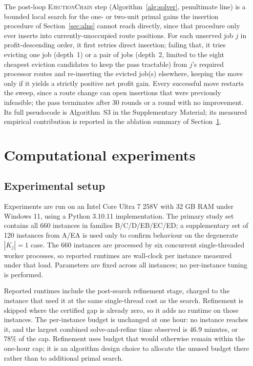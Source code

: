 \documentclass[preprint,12pt]{elsarticle}
\begin{document}
The post-loop \textsc{EjectionChain} step (Algorithm~\ref{alg:solver}, penultimate line) is a bounded local search for the one- or two-unit primal gains the insertion procedure of Section~\ref{sec:alns} cannot reach directly, since that procedure only ever inserts into currently-unoccupied route positions. For each unserved job $j$ in profit-descending order, it first retries direct insertion; failing that, it tries evicting one job (depth~1) or a pair of jobs (depth~2, limited to the eight cheapest eviction candidates to keep the pass tractable) from $j$'s required processor routes and re-inserting the evicted job(s) elsewhere, keeping the move only if it yields a strictly positive net profit gain. Every successful move restarts the sweep, since a route change can open insertions that were previously infeasible; the pass terminates after 30 rounds or a round with no improvement. Its full pseudocode is Algorithm~S3 in the Supplementary Material; its measured empirical contribution is reported in the ablation summary of Section~\ref{sec:experiments}.



\section{Computational experiments}\label{sec:experiments}

\subsection{Experimental setup}

Experiments are run on an Intel Core Ultra 7 258V with 32 GB RAM under Windows 11, using a Python 3.10.11 implementation. The primary study set contains all 660 instances in families B/C/D/EB/EC/ED; a supplementary set of 120 instances from A/EA is used only to confirm behaviour on the degenerate $|K_j|=1$ case. The 660 instances are processed by six concurrent single-threaded worker processes, so reported runtimes are wall-clock per instance measured under that load. Parameters are fixed across all instances; no per-instance tuning is performed.

Reported runtimes include the post-search refinement stage, charged to the instance that used it at the same single-thread cost as the search. Refinement is skipped where the certified gap is already zero, so it adds no runtime on those instances. The per-instance budget is unchanged at one hour: no instance reaches it, and the largest combined solve-and-refine time observed is $46.9$ minutes, or $78\%$ of the cap. Refinement uses budget that would otherwise remain within the one-hour cap; it is an algorithm design choice to allocate the unused budget there rather than to additional primal search.
\end{document}
